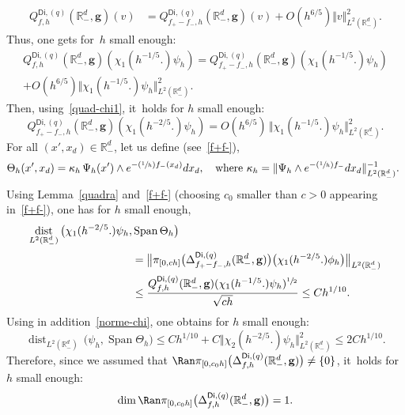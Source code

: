 \documentclass[10pt]{amsart}
\newcommand{\Psfrac}[2]{(\sfrac{#1}{#2})}
\DeclareMathOperator{\dist}{dist}
\DeclareMathOperator{\Span}{Span}
\newcommand{\mbf}[1]{\mathbf{#1}}
\theoremstyle{plain}
\theoremstyle{definition}
\begin{document}
\begin{align}
\label{eq.=forme}
Q_{f,h}^{\mathsf{Di},(q)}(\mathbb R^d_-, { \mbf g}) (v)&=Q_{f_+-f_-,h}^{\mathsf{Di},(q)}(\mathbb R^d_-, { \mbf g}) (v) + O(h^{6/5}) \Vert v \Vert_{L^2(\mathbb R^d_-)}^2.
\end{align}
Thus, one gets for~$h$ small enough:
\begin{multline*}
Q_{f,h}^{\mathsf{Di},(q)}(\mathbb R^d_-, { \mbf g}) (\chi_1(h^{-1/5 }.) \psi_h)=Q_{f_+-f_-,h}^{\mathsf{Di},(q)}(\mathbb R^d_-, { \mbf g}) (\chi_1(h^{-1/5 }.) \psi_h) \\
+ O(h^{ 6/5}) \big \Vert \chi_1(h^{-1/5 }.) \psi_h \big \Vert_{L^2(\mathbb R^d_-)}^2.
\end{multline*}
Then, using~\eqref{quad-chi1}, it~holds for $h$ small enough:
\[
Q_{f_+-f_-,h}^{\mathsf{Di},(q)}(\mathbb R^d_-, { \mbf g}) (\chi_1(h^{-2/5 }.) \psi_h)=O(h^{6/5})\, \big\Vert \chi_1(h^{-1/5 }.) \psi_h \big\Vert_{L^2(\mathbb R_-^d)}^2.
\]
For all $(x',x_d)\in \mathbb R^d_-$, let us define (see~\eqref{f+f-}),
\[
\Theta_h(x',x_d)=\kappa_h\, \Psi_h(x')\wedge e^{-\Psfrac 1h f_-(x_d)}dx_d, \quad\text{where $\kappa_h= \Vert \Psi_h\wedge e^{-\Psfrac 1h f_-}dx_d\Vert_{L^2(\mathbb R^d_-)}^{-1}$. }
\]
Using Lemma~\ref{quadra} and~\eqref{f+f-} (choosing $c_0$ smaller than $c>0$ appearing in~\eqref{f+f-}), one has for $h$ small enough,
\begin{align*}
\dist_{L^2(\mathbb R_-^d)}\, \bigl(\chi_1(h^{-2/5 }.) \psi_h,&\Span \Theta_h\bigr)\\
&=\big \Vert \pi_{[0,ch]}\bigl(\Delta_{f_+-f_-,h}^{\mathsf{Di},(q)}(\mathbb R_-^d, { \mbf g})\bigr)\bigl(\chi_1(h^{-2/5 }.)\phi_h \bigr)\big \Vert_{L^2(\mathbb R^d_-)}\\
&\le \frac{ Q_{f,h}^{\mathsf{Di},(q)}(\mathbb R^d_-, { \mbf g}) (\chi_1(h^{-1/5 }.) \psi_h)^{\sfrac12}}{\sqrt{ch}} \le Ch^{{1}/{10}}.
\end{align*}
Using in addition~\eqref{norme-chi}, one obtains for $h$ small enough:
\[
\dist_{L^2(\mathbb R_-^d)}\, \bigl(\psi_h,\Span \Theta_h\bigr)\le Ch^{ {1}/{10}} + C \Vert \chi_2(h^{-2/5 }.) \psi_h \Vert_{L^2(\mathbb R_-^d)}^2 \le 2Ch^{ {1}/{10}}.
\]
Therefore, since we assumed that $\Ran \pi _{[0,c_0h]}\bigl(\Delta_{f,h}^{\mathsf{Di},(q)}(\mathbb R_-^d, \mbf g) \bigr) \neq \{0\}$, it~holds for $h$ small enough:
\[
\dim \Ran \pi_{[0,c_0h]}\bigl(\Delta_{f,h}^{\mathsf{Di},(q)}(\mathbb R_-^d, \mbf g)\bigr)=1.
\]
\end{document}
